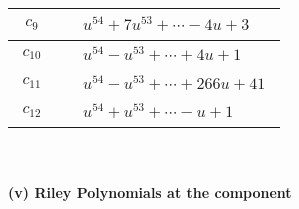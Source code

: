 \documentclass[1p]{elsarticle_modified}
\theoremstyle{definition}
\begin{document}
\begin{tabular}{m{50pt}|m{274pt}}
\hline $$\begin{aligned}c_{9}\end{aligned}$$&$\begin{aligned}
&u^{54}+7 u^{53}+\cdots-4 u+3
\end{aligned}$\\
\hline $$\begin{aligned}c_{10}\end{aligned}$$&$\begin{aligned}
&u^{54}- u^{53}+\cdots+4 u+1
\end{aligned}$\\
\hline $$\begin{aligned}c_{11}\end{aligned}$$&$\begin{aligned}
&u^{54}- u^{53}+\cdots+266 u+41
\end{aligned}$\\
\hline $$\begin{aligned}c_{12}\end{aligned}$$&$\begin{aligned}
&u^{54}+u^{53}+\cdots- u+1
\end{aligned}$\\
\hline
\end{tabular}\\~\\
\newpage\renewcommand{\arraystretch}{1}
\flushleft \textbf{(v) Riley Polynomials at the component}\newline \\
\end{document}
